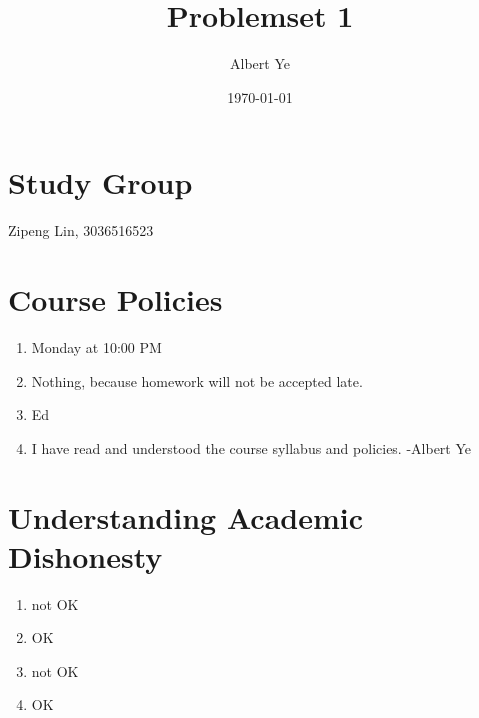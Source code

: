 \documentclass{article}
\title{Problemset 1}
\author{Albert Ye}
\date{\today}
\begin{document}
\maketitle
\section{Study Group}
Zipeng Lin, 3036516523

\section{Course Policies}
\begin{enumerate}[label = \alph*)]
	\item Monday at 10:00 PM 
	\item Nothing, because homework will not be accepted late.
	\item Ed 
	\item I have read and understood the course syllabus and policies. -Albert Ye
\end{enumerate}

\section{Understanding Academic Dishonesty}
\begin{enumerate}[label = \alph*)]
	\item not OK
	\item OK
	\item not OK
	\item OK
\end{enumerate}

\newpage
\end{document}

